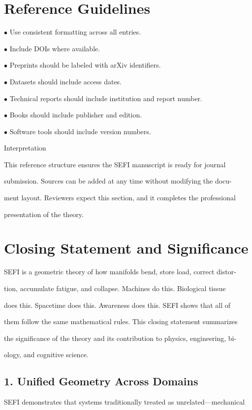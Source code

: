 \documentclass[10pt]{article}
\begin{document}
\section*{Reference Guidelines}
\noindent $\bullet$ Use consistent formatting across all entries.

\noindent $\bullet$ Include DOIs where available.

\noindent $\bullet$ Preprints should be labeled with arXiv identifiers.

\noindent $\bullet$ Datasets should include access dates.

\noindent $\bullet$ Technical reports should include institution and report number.

\noindent $\bullet$ Books should include publisher and edition.

\noindent $\bullet$ Software tools should include version numbers.


Interpretation

This reference structure ensures the SEFI manuscript is ready for journal

submission. Sources can be added at any time without modifying the docu-

ment layout. Reviewers expect this section, and it completes the professional

presentation of the theory.

\section*{Closing Statement and Significance}
SEFI is a geometric theory of how manifolds bend, store load, correct distor-

tion, accumulate fatigue, and collapse. Machines do this. Biological tissue

does this. Spacetime does this. Awareness does this. SEFI shows that all of

them follow the same mathematical rules. This closing statement summarizes

the significance of the theory and its contribution to physics, engineering, bi-

ology, and cognitive science.

\subsection*{1. Unified Geometry Across Domains}
SEFI demonstrates that systems traditionally treated as unrelated---mechanical
\end{document}
